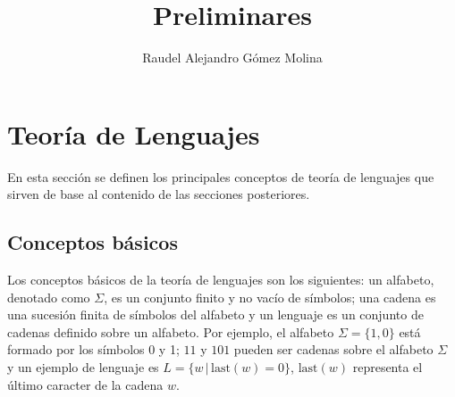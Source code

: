 \documentclass[12pt]{article}
\title{Preliminares}
\author{Raudel Alejandro Gómez Molina}
\begin{document}
\maketitle





\section{Teoría de Lenguajes}

En esta sección se definen los principales conceptos de teoría de lenguajes que sirven de base al contenido de las secciones posteriores.

\subsection{Conceptos básicos}

Los conceptos básicos de la teoría de lenguajes son los siguientes: un alfabeto, denotado como $\Sigma$, es un conjunto finito y no vacío de símbolos;
una cadena es una sucesión finita de símbolos del alfabeto y un lenguaje es un conjunto de cadenas definido sobre un alfabeto. Por ejemplo, el 
alfabeto $\Sigma=\{1,0\}$ está formado por los símbolos 0 y 1; $11$ y $101$ pueden ser cadenas sobre el alfabeto $\Sigma$ y un ejemplo de lenguaje
es $L=\{w\,|\,\text{last}(w)=0\}$, $\text{last}(w)$ representa el último caracter de la cadena $w$.
\end{document}
